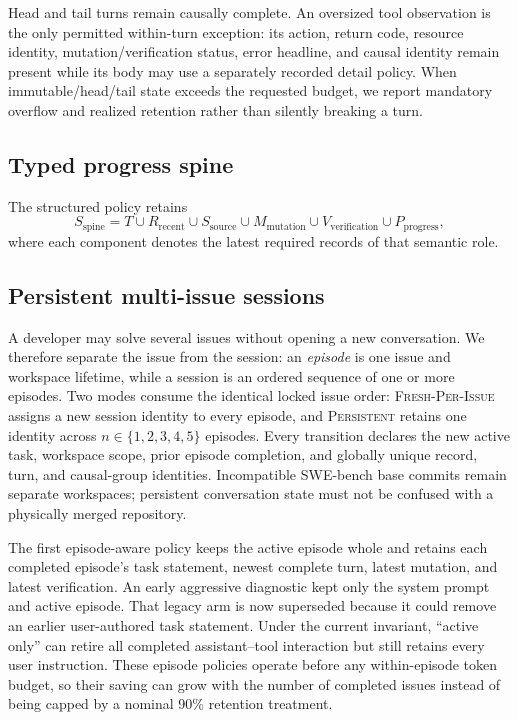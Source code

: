 \documentclass[11pt]{article}
\begin{document}
Head and tail turns remain causally complete. An oversized tool observation is
the only permitted within-turn exception: its action, return code, resource
identity, mutation/verification status, error headline, and causal identity
remain present while its body may use a separately recorded detail policy.
When immutable/head/tail state exceeds the requested budget, we report
mandatory overflow and realized retention rather than silently breaking a turn.

\subsection{Typed progress spine}

The structured policy retains
\[
S_{\mathrm{spine}} =
T
\cup
R_{\mathrm{recent}}
\cup
S_{\mathrm{source}}
\cup
M_{\mathrm{mutation}}
\cup
V_{\mathrm{verification}}
\cup
P_{\mathrm{progress}},
\]
where each component denotes the latest required records of that semantic role.

\subsection{Persistent multi-issue sessions}

A developer may solve several issues without opening a new conversation.  We
therefore separate the issue from the session: an \emph{episode} is one issue
and workspace lifetime, while a session is an ordered sequence of one or more
episodes.  Two modes consume the identical locked issue order:
\textsc{Fresh-Per-Issue} assigns a new session identity to every episode, and
\textsc{Persistent} retains one identity across $n\in\{1,2,3,4,5\}$ episodes.
Every transition declares the new active task, workspace scope, prior episode
completion, and globally unique record, turn, and causal-group identities.
Incompatible SWE-bench base commits remain separate workspaces; persistent
conversation state must not be confused with a physically merged repository.

The first episode-aware policy keeps the active episode whole and retains each
completed episode's task statement, newest complete turn, latest mutation, and
latest verification.  An early aggressive diagnostic kept only the system
prompt and active episode.  That legacy arm is now superseded because it could
remove an earlier user-authored task statement.  Under the current invariant,
``active only'' can retire all completed assistant--tool interaction but still
retains every user instruction.  These episode policies operate before any within-episode token budget, so their
saving can grow with the number of completed issues instead of being capped by
a nominal 90\% retention treatment.
\end{document}
